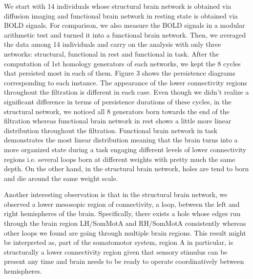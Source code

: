 \documentclass[9pt,twocolumn,twoside,lineno]{pnas-new}
\begin{document}
We start with 14 individuals whose structural brain network is obtained via diffusion imaging and functional brain network in resting state is obtained via BOLD signals. For comparison, we also measure the BOLD signals in a modular arithmetic test and turned it into a functional brain network. Then, we averaged the data among 14 individuals and carry on the analysis with only three networks: structural, functional in rest and functional in task. After the computation of 1st homology generators of each networks, we kept the 8 cycles that persisted most in each of them. Figure 3 shows the persistence diagrams corresponding to each instance. The appearance of the lower connectivity regions throughout the filtration is different in each case. Even though we didn't realize a significant difference in terms of persistence durations of these cycles, in the structural network, we noticed all 8 generators born towards the end of the filtration whereas functional brain network in rest shows a little more linear distribution throughout the filtration. Functional brain network in task demonstrates the most linear distribution meaning that the brain turns into a more organized state during a task engaging different levels of lower connectivity regions i.e. several loops born at different weights with pretty much the same depth. On the other hand, in the structural brain network, holes are tend to born and die around the same weight scale. 

Another interesting observation is that in the structural brain network, we observed a lower mesosopic region of connectivity, a loop, between the left and right hemispheres of the brain. Specifically, there exists a hole whose edges run through the brain region LH/SomMotA and RH/SomMotA consistently whereas other loops we found are going through multiple brain regions. This result might be interpreted as, part of the somatomotor system, region A in particular, is structurally a lower connectivity region given that sensory stimulus can be present any time and brain needs to be ready to operate coordinatively between hemispheres.
\end{document}
